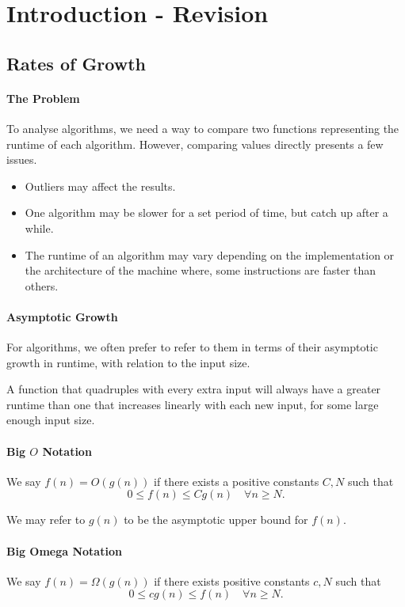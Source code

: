 
\section{Introduction - Revision}

\subsection{Rates of Growth}

\paragraph{The Problem}

To analyse algorithms, we need a way to compare two functions representing
the runtime of each algorithm. However, comparing values directly presents
a few issues.
\begin{itemize}
    \item Outliers may affect the results.
    \item One algorithm may be slower for a set period of time, but catch
    up after a while.
    \item The runtime of an algorithm may vary depending on the
    implementation or the architecture of the machine where, some
    instructions are faster than others.
\end{itemize}

\paragraph{Asymptotic Growth}
For algorithms, we often prefer to refer to them in terms of their
asymptotic growth in runtime, with relation to the input size.

A function that quadruples with every extra input will always have a
greater runtime than one that increases linearly with each new input, for
some large enough input size.

\paragraph{Big \(O\) Notation}
We say \(f(n) = O(g(n))\) if there exists a positive constants \(C, N\)
such that
\[
    0 \leq f(n) \leq C g(n) \quad \forall n \geq N.
\]

We may refer to \(g(n)\) to be the asymptotic upper bound for \(f(n)\).

\paragraph{Big Omega Notation}
We say \(f(n) = \Omega(g(n))\) if there exists positive constants \(c, N\)
such that 
\[0 \leq c g(n) \leq f(n) \quad \forall n \geq N.\]

